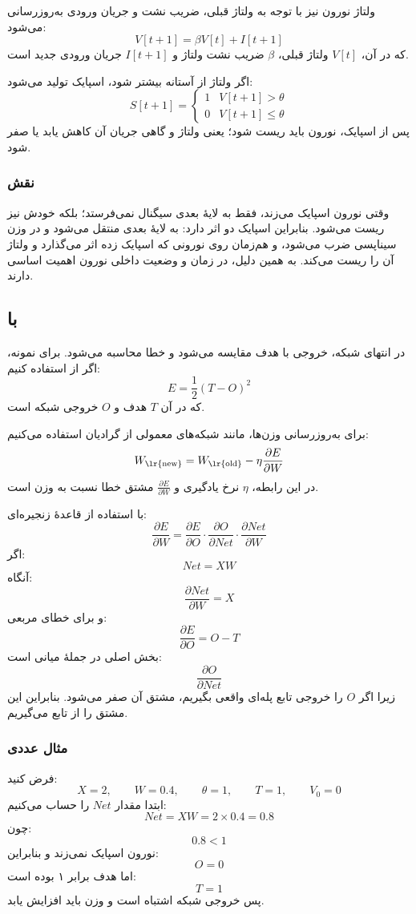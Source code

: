 ولتاژ نورون نیز با توجه به ولتاژ قبلی، ضریب نشت و جریان ورودی به‌روزرسانی می‌شود:
\[
V[t+1] = \beta V[t] + I[t+1]
\]
که در آن، \(V[t]\) ولتاژ قبلی، \(\beta\) ضریب نشت ولتاژ و \(I[t+1]\) جریان ورودی جدید است.

اگر ولتاژ از آستانه بیشتر شود، اسپایک تولید می‌شود:
\[
S[t+1] =
\begin{cases}
1 & V[t+1] > \theta \\
0 & V[t+1] \leq \theta
\end{cases}
\]
پس از اسپایک، نورون باید ریست شود؛ یعنی ولتاژ و گاهی جریان آن کاهش یابد یا صفر شود.

\subsubsection{نقش }
وقتی نورون اسپایک می‌زند، فقط به لایهٔ بعدی سیگنال نمی‌فرستد؛ بلکه خودش نیز ریست می‌شود. بنابراین اسپایک دو اثر دارد: به لایهٔ بعدی منتقل می‌شود و در وزن سیناپسی ضرب می‌شود، و هم‌زمان روی نورونی که اسپایک زده اثر می‌گذارد و ولتاژ آن را ریست می‌کند. به همین دلیل، در  زمان و وضعیت داخلی نورون اهمیت اساسی دارند.

\subsection{ با }
در انتهای شبکه، خروجی با هدف مقایسه می‌شود و خطا محاسبه می‌شود. برای نمونه، اگر از  استفاده کنیم:
\[
E = \frac{1}{2}(T - O)^2
\]
که در آن \(T\) هدف و \(O\) خروجی شبکه است.

برای به‌روزرسانی وزن‌ها، مانند شبکه‌های معمولی از گرادیان استفاده می‌کنیم:
\[
W_{\text{\lr{new}}} =
W_{\text{\lr{old}}} - \eta \frac{\partial E}{\partial W}
\]
در این رابطه، \(\eta\) نرخ یادگیری و \(\frac{\partial E}{\partial W}\) مشتق خطا نسبت به وزن است.

با استفاده از قاعدهٔ زنجیره‌ای:
\[
\frac{\partial E}{\partial W}
=
\frac{\partial E}{\partial O}
\cdot
\frac{\partial O}{\partial Net}
\cdot
\frac{\partial Net}{\partial W}
\]
اگر:
\[
Net = XW
\]
آنگاه:
\[
\frac{\partial Net}{\partial W} = X
\]
و برای خطای مربعی:
\[
\frac{\partial E}{\partial O} = O - T
\]
بخش اصلی  در جملهٔ میانی است:
\[
\frac{\partial O}{\partial Net}
\]
زیرا اگر \(O\) را خروجی تابع پله‌ای واقعی بگیریم، مشتق آن صفر می‌شود. بنابراین این مشتق را از تابع  می‌گیریم.

\subsubsection{مثال عددی}
فرض کنید:
\[
X = 2,\qquad W = 0.4,\qquad \theta = 1,\qquad T = 1,\qquad V_0 = 0
\]
ابتدا مقدار \(Net\) را حساب می‌کنیم:
\[
Net = XW = 2 \times 0.4 = 0.8
\]
چون:
\[
0.8 < 1
\]
نورون اسپایک نمی‌زند و بنابراین:
\[
O = 0
\]
اما هدف برابر ۱ بوده است:
\[
T = 1
\]
پس خروجی شبکه اشتباه است و وزن باید افزایش یابد.


